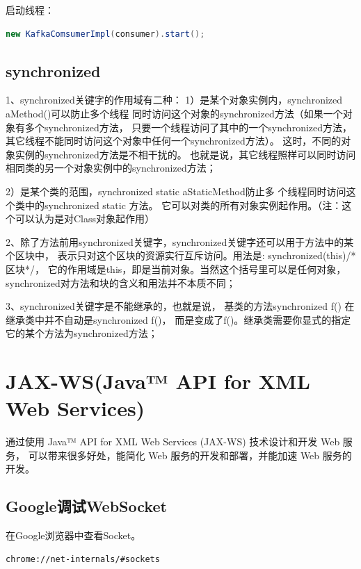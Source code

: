 \documentclass{book}
\begin{document}
启动线程：

\begin{lstlisting}[language=Java]
new KafkaComsumerImpl(consumer).start();
\end{lstlisting}

\subsection{synchronized}

1、synchronized关键字的作用域有二种： 
1）是某个对象实例内，synchronized aMethod(){}可以防止多个线程
同时访问这个对象的synchronized方法（如果一个对象有多个synchronized方法，
只要一个线程访问了其中的一个synchronized方法，
其它线程不能同时访问这个对象中任何一个synchronized方法）。
这时，不同的对象实例的synchronized方法是不相干扰的。
也就是说，其它线程照样可以同时访问相同类的另一个对象实例中的synchronized方法； 

2）是某个类的范围，synchronized static aStaticMethod{}防止多
个线程同时访问这个类中的synchronized static 方法。
它可以对类的所有对象实例起作用。（注：这个可以认为是对Class对象起作用） 

2、除了方法前用synchronized关键字，synchronized关键字还可以用于方法中的某个区块中，
表示只对这个区块的资源实行互斥访问。用法是: synchronized(this){/*区块*/}，
它的作用域是this，即是当前对象。当然这个括号里可以是任何对象，
synchronized对方法和块的含义和用法并不本质不同； 

3、synchronized关键字是不能继承的，也就是说，
基类的方法synchronized f(){} 在继承类中并不自动是synchronized f(){}，
而是变成了f(){}。继承类需要你显式的指定它的某个方法为synchronized方法；

\section{JAX-WS(Java™ API for XML Web Services)}

通过使用 Java™ API for XML Web Services (JAX-WS) 技术设计和开发 Web 服务，
可以带来很多好处，能简化 Web 服务的开发和部署，并能加速 Web 服务的开发。

\subsection{Google调试WebSocket}

在Google浏览器中查看Socket。


\begin{lstlisting}[language=HTML]
chrome://net-internals/#sockets
\end{lstlisting}
\end{document}
